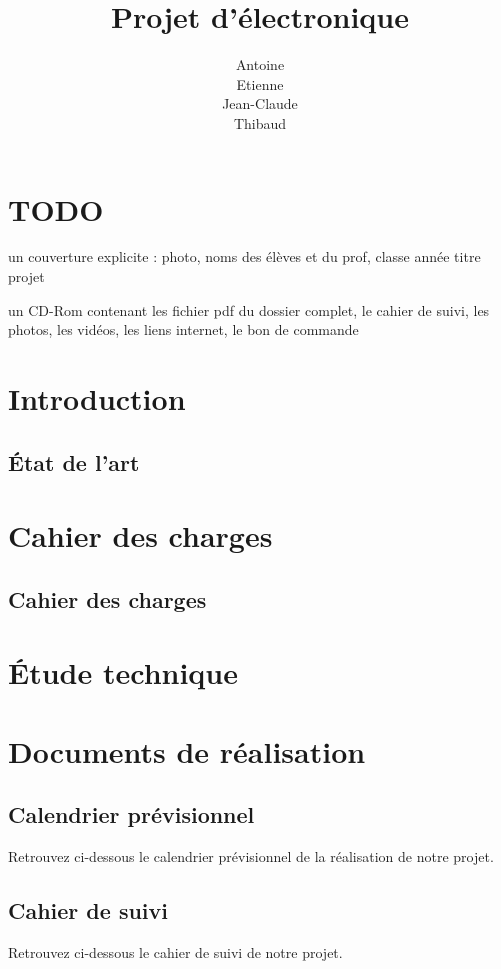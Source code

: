 \documentclass[12pt,titlepage,a4paper]{report}
\title{Projet d'électronique}
\author{Antoine \bsc{Augusti}\\ Etienne \bsc{Batise}\\ Jean-Claude \bsc{Bernard}\\ Thibaud \bsc{Dauce}}
\begin{document}

	\dominitoc
	\tableofcontents

	\setcounter{page}{1}
	\part{TODO}
	un couverture explicite : photo, noms des élèves et du prof, classe année titre projet

	un CD-Rom contenant les fichier pdf du dossier complet, le cahier de suivi, les photos, les vidéos, les liens internet, le bon de commande

	
	\part{Introduction}
	\chapter{État de l'art}
	\minitoc
	


	\part{Cahier des charges}
	\chapter{Cahier des charges}
	


	\part{Étude technique}
	


	\part{Documents de réalisation}
	\chapter{Calendrier prévisionnel}
	Retrouvez ci-dessous le calendrier prévisionnel de la réalisation de notre projet.
	
	
	\chapter{Cahier de suivi}
	\minitoc
	Retrouvez ci-dessous le cahier de suivi de notre projet.
	
\end{document}
